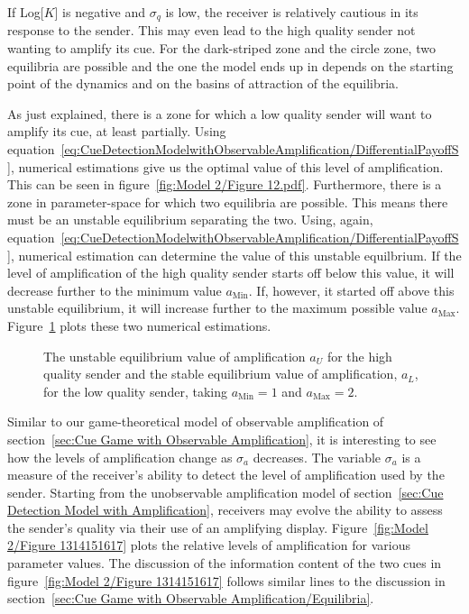 \documentclass[a4paper,12pt]{article}
\numberwithin{equation}{section}
\begin{document}
If Log[$K$] is negative and $\sigma_{q}$ is low, the receiver is relatively cautious in its response to the sender. This may even lead to the high quality sender not wanting to amplify its cue. For the dark-striped zone and the circle zone, two equilibria are possible and the one the model ends up in depends on the starting point of the dynamics and on the basins of attraction of the equilibria.

As just explained, there is a zone for which a low quality sender will want to amplify its cue, at least partially. Using equation~\ref{eq:CueDetectionModelwithObservableAmplification/DifferentialPayoffS}, numerical estimations give us the optimal value of this level of amplification. This can be seen in figure~\ref{fig:Model 2/Figure 12.pdf}. Furthermore, there is a zone in parameter-space for which two equilibria are possible. This means there must be an unstable equilibrium separating the two. Using, again, equation~\ref{eq:CueDetectionModelwithObservableAmplification/DifferentialPayoffS}, numerical estimation can determine the value of this unstable equilbrium. If the level of amplification of the high quality sender starts off below this value, it will decrease further to the minimum value $a_{\text{Min}}$. If, however, it started off above this unstable equilibrium, it will increase further to the maximum possible value $a_{\text{Max}}$. Figure~\ref{fig:Model 2/Figure 1112} plots these two numerical estimations.

\begin{figure}[!h]
\captionsetup{width=380pt}
\begin{center}
\hspace{6mm}
\caption{The unstable equilibrium value of amplification $a_{U}$ for the high quality sender and the stable equilibrium value of amplification, $a_{L}$, for the low quality sender, taking $a_{\text{Min}}=1$ and $a_{\text{Max}}=2$.}
\label{fig:Model 2/Figure 1112}
\end{center}
\end{figure}

Similar to our game-theoretical model of observable amplification of section~\ref{sec:Cue Game with Observable Amplification}, it is interesting to see how the levels of amplification change as $\sigma_{a}$ decreases. The variable $\sigma_{a}$ is a measure of the receiver's ability to detect the level of amplification used by the sender. Starting from the unobservable amplification model of section~\ref{sec:Cue Detection Model with Amplification}, receivers may evolve the ability to assess the sender's quality via their use of an amplifying display. Figure~\ref{fig:Model 2/Figure 1314151617} plots the relative levels of amplification for various parameter values. The discussion of the information content of the two cues in figure~\ref{fig:Model 2/Figure 1314151617} follows similar lines to the discussion in section~\ref{sec:Cue Game with Observable Amplification/Equilibria}.
\end{document}
